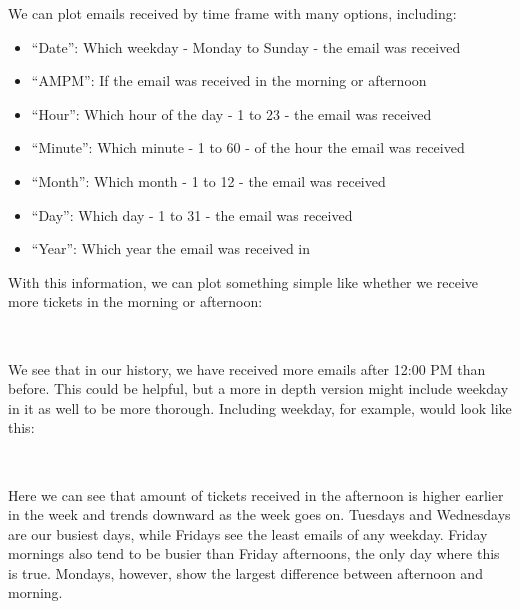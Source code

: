 \documentclass[11pt]{article}
\providecommand{\tightlist}{%
      \setlength{\itemsep}{0pt}\setlength{\parskip}{0pt}}
\begin{document}
We can plot emails received by time frame with many options, including:

\begin{itemize}
\tightlist
\item
  ``Date'': Which weekday - Monday to Sunday - the email was received 
\item
  ``AMPM'': If the email was received in the morning or afternoon 
\item
  ``Hour'': Which hour of the day - 1 to 23 - the email was received 
\item
  ``Minute'': Which minute - 1 to 60 - of the hour the email was
  received 
\item
  ``Month'': Which month - 1 to 12 - the email was received 
\item
  ``Day'': Which day - 1 to 31 - the email was received 
\item
  ``Year'': Which year the email was received in 
\end{itemize}

With this information, we can plot something simple like whether we
receive more tickets in the morning or afternoon:

    \begin{center}
    \end{center}
    { \hspace*{\fill} \\}
    
    We see that in our history, we have received more emails after 12:00 PM
than before. This could be helpful, but a more in depth version might
include weekday in it as well to be more thorough. Including weekday,
for example, would look like this:

    \begin{center}
    \end{center}
    { \hspace*{\fill} \\}
    
    Here we can see that amount of tickets received in the afternoon is
higher earlier in the week and trends downward as the week goes on.
Tuesdays and Wednesdays are our busiest days, while Fridays see the
least emails of any weekday. Friday mornings also tend to be busier than
Friday afternoons, the only day where this is true. Mondays, however,
show the largest difference between afternoon and morning.
\end{document}

